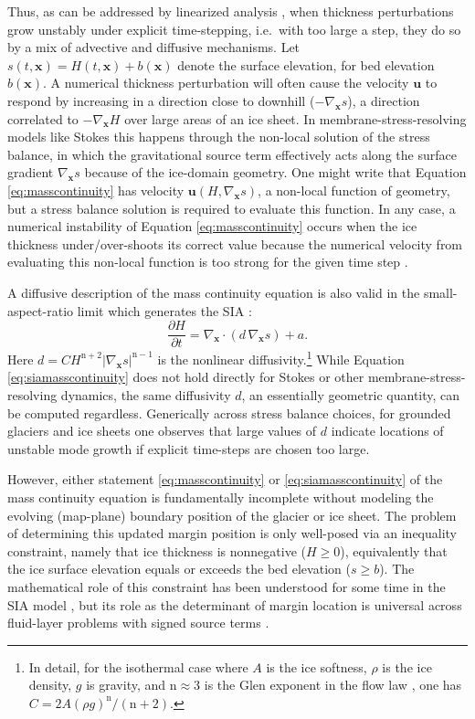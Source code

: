 \documentclass[review]{igs}
\newcommand\bu{\mathbf{u}}
\newcommand\bx{\mathbf{x}}
\newcommand{\Divx}{\nabla_\bx \cdot}
\newcommand{\gradx}{\nabla_\bx}
\newcommand{\nn}{\text{n}}
\begin{document}
Thus, as can be addressed by linearized analysis \citep{Robinsonetal2022}, when thickness perturbations grow unstably under explicit time-stepping, i.e.~with too large a step, they do so by a mix of  advective and diffusive mechanisms.  Let $s(t,\bx)=H(t,\bx)+b(\bx)$ denote the surface elevation, for bed elevation $b(\bx)$.  A numerical thickness perturbation will often cause the velocity $\bu$ to respond by increasing in a direction close to downhill ($-\gradx s$), a direction correlated to $-\gradx H$ over large areas of an ice sheet.  In membrane-stress-resolving models like Stokes this happens through the non-local solution of the stress balance, in which the gravitational source term effectively acts along the surface gradient $\gradx s$ because of the ice-domain geometry.  One might write that Equation \eqref{eq:masscontinuity} has velocity $\bu(H,\gradx s)$, a non-local function of geometry, but a stress balance solution is required to evaluate this function.  In any case, a numerical instability of Equation \eqref{eq:masscontinuity} occurs when the ice thickness under/over-shoots its correct value because the numerical velocity from evaluating this non-local function is too strong for the given time step \citep{LeVeque2007}.

A diffusive description of the mass continuity equation is also valid in the small-aspect-ratio limit which generates the SIA \citep{SchoofHewitt2013}:
\begin{equation}
\frac{\partial H}{\partial t} = \Divx \left(d\, \gradx s \right) + a. \label{eq:siamasscontinuity}
\end{equation}
Here $d = C H^{\nn+2} |\gradx s|^{\nn-1}$ is the nonlinear diffusivity.\footnote{In detail, for the isothermal case where $A$ is the ice softness, $\rho$ is the ice density, $g$ is gravity, and $\nn\approx 3$ is the Glen exponent in the flow law \citep{GreveBlatter2009}, one has $C = 2 A (\rho g)^\nn/(\nn+2)$.}  While Equation \eqref{eq:siamasscontinuity} does not hold directly for Stokes or other membrane-stress-resolving dynamics, the same diffusivity $d$, an essentially geometric quantity, can be computed regardless.  Generically across stress balance choices, for grounded glaciers and ice sheets one observes that large values of $d$ indicate locations of unstable mode growth if explicit time-steps are chosen too large.

However, either statement \eqref{eq:masscontinuity} or \eqref{eq:siamasscontinuity} of the mass continuity equation is fundamentally incomplete without modeling the evolving (map-plane) boundary position of the glacier or ice sheet.  The problem of determining this updated margin position is only well-posed via an inequality constraint, namely that ice thickness is nonnegative ($H\ge 0$), equivalently that the ice surface elevation equals or exceeds the bed elevation ($s \ge b$).  The mathematical role of this constraint has been understood for some time in the SIA model \citep{Calvoetal2003,JouvetBueler2012,SchoofHewitt2013}, but its role as the determinant of margin location is universal across fluid-layer problems with signed source terms \citep{Bueler2021conservation}.
\end{document}

